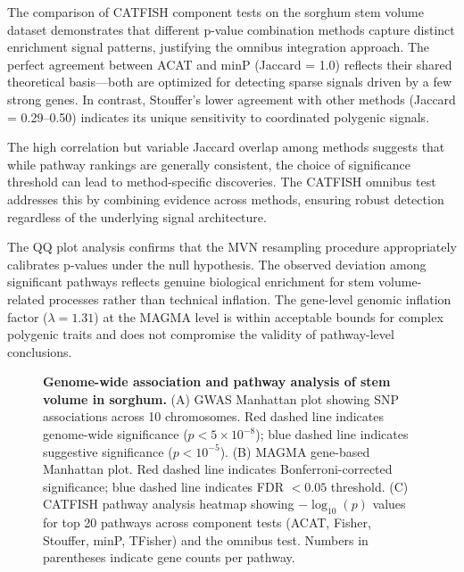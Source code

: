 \documentclass[11pt]{article}
\begin{document}
The comparison of CATFISH component tests on the sorghum stem volume dataset demonstrates that different p-value combination methods capture distinct enrichment signal patterns, justifying the omnibus integration approach. The perfect agreement between ACAT and minP (Jaccard = 1.0) reflects their shared theoretical basis---both are optimized for detecting sparse signals driven by a few strong genes. In contrast, Stouffer's lower agreement with other methods (Jaccard = 0.29--0.50) indicates its unique sensitivity to coordinated polygenic signals.

The high correlation but variable Jaccard overlap among methods suggests that while pathway rankings are generally consistent, the choice of significance threshold can lead to method-specific discoveries. The CATFISH omnibus test addresses this by combining evidence across methods, ensuring robust detection regardless of the underlying signal architecture.

The QQ plot analysis confirms that the MVN resampling procedure appropriately calibrates p-values under the null hypothesis. The observed deviation among significant pathways reflects genuine biological enrichment for stem volume-related processes rather than technical inflation. The gene-level genomic inflation factor ($\lambda = 1.31$) at the MAGMA level is within acceptable bounds for complex polygenic traits and does not compromise the validity of pathway-level conclusions.


\begin{figure}[htbp]
\centering
\caption{\textbf{Genome-wide association and pathway analysis of stem volume in sorghum.}
(A) GWAS Manhattan plot showing SNP associations across 10 chromosomes. Red dashed line indicates genome-wide significance ($p < 5 \times 10^{-8}$); blue dashed line indicates suggestive significance ($p < 10^{-5}$).
(B) MAGMA gene-based Manhattan plot. Red dashed line indicates Bonferroni-corrected significance; blue dashed line indicates FDR $< 0.05$ threshold.
(C) CATFISH pathway analysis heatmap showing $-\log_{10}(p)$ values for top 20 pathways across component tests (ACAT, Fisher, Stouffer, minP, TFisher) and the omnibus test. Numbers in parentheses indicate gene counts per pathway.}
\label{fig:figure4}
\end{figure}
\end{document}
